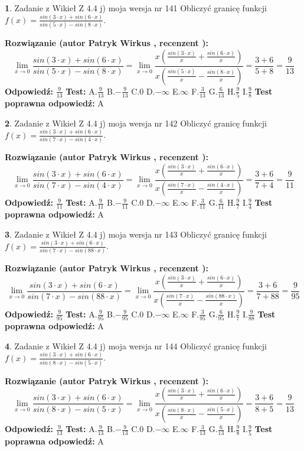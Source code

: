 \documentclass[12pt, a4paper]{article}
\theoremstyle{definition} %
\newtheorem{zad}{}
\newcommand{\zadStart}[1]{\begin{zad}#1\newline}
\newcommand{\zadStop}{\end{zad}}
\newcommand{\rozwStart}[2]{\noindent \textbf{Rozwiązanie (autor #1 , recenzent #2): }\newline}
\newcommand{\rozwStop}{\newline}
\newcommand{\odpStart}{\noindent \textbf{Odpowiedź:}\newline}
\newcommand{\odpStop}{\newline}
\newcommand{\testStart}{\noindent \textbf{Test:}\newline}
\newcommand{\testStop}{\newline}
\newcommand{\kluczStart}{\noindent \textbf{Test poprawna odpowiedź:}\newline}
\newcommand{\kluczStop}{\newline}
\begin{document}
\zadStart{Zadanie z Wikieł Z 4.4 j) moja wersja nr 141}
Obliczyć granicę funkcji $f(x)=\frac{sin(3\cdot x) +sin(6\cdot x)}{sin(5\cdot x) -sin(8\cdot x)}$.
\zadStop
\rozwStart{Patryk Wirkus}{}
$$\lim\limits_{x\to 0}\frac{sin(3\cdot x) +sin(6\cdot x)}{sin(5\cdot x) -sin(8\cdot x)}=\lim\limits_{x\to 0}\frac{x(\frac{sin(3\cdot x)}{x}+\frac{sin(6\cdot x)}{x})}{x(\frac{sin(5\cdot x)}{x}-\frac{sin(8\cdot x)}{x})}=\frac{3+6}{5+8} = \frac{9}{13}$$
\rozwStop
\odpStart
$\frac{9}{13}$
\odpStop
\testStart
A.$\frac{9}{13}$
B.$-\frac{9}{13}$
C.$0$
D.$-\infty$
E.$\infty$
F.$\frac{3}{13}$
G.$\frac{6}{13}$
H.$\frac{9}{5}$
I.$\frac{9}{8}$
\testStop
\kluczStart
A
\kluczStop



\zadStart{Zadanie z Wikieł Z 4.4 j) moja wersja nr 142}
Obliczyć granicę funkcji $f(x)=\frac{sin(3\cdot x) +sin(6\cdot x)}{sin(7\cdot x) -sin(4\cdot x)}$.
\zadStop
\rozwStart{Patryk Wirkus}{}
$$\lim\limits_{x\to 0}\frac{sin(3\cdot x) +sin(6\cdot x)}{sin(7\cdot x) -sin(4\cdot x)}=\lim\limits_{x\to 0}\frac{x(\frac{sin(3\cdot x)}{x}+\frac{sin(6\cdot x)}{x})}{x(\frac{sin(7\cdot x)}{x}-\frac{sin(4\cdot x)}{x})}=\frac{3+6}{7+4} = \frac{9}{11}$$
\rozwStop
\odpStart
$\frac{9}{11}$
\odpStop
\testStart
A.$\frac{9}{11}$
B.$-\frac{9}{11}$
C.$0$
D.$-\infty$
E.$\infty$
F.$\frac{3}{11}$
G.$\frac{6}{11}$
H.$\frac{9}{7}$
I.$\frac{9}{4}$
\testStop
\kluczStart
A
\kluczStop



\zadStart{Zadanie z Wikieł Z 4.4 j) moja wersja nr 143}
Obliczyć granicę funkcji $f(x)=\frac{sin(3\cdot x) +sin(6\cdot x)}{sin(7\cdot x) -sin(88\cdot x)}$.
\zadStop
\rozwStart{Patryk Wirkus}{}
$$\lim\limits_{x\to 0}\frac{sin(3\cdot x) +sin(6\cdot x)}{sin(7\cdot x) -sin(88\cdot x)}=\lim\limits_{x\to 0}\frac{x(\frac{sin(3\cdot x)}{x}+\frac{sin(6\cdot x)}{x})}{x(\frac{sin(7\cdot x)}{x}-\frac{sin(88\cdot x)}{x})}=\frac{3+6}{7+88} = \frac{9}{95}$$
\rozwStop
\odpStart
$\frac{9}{95}$
\odpStop
\testStart
A.$\frac{9}{95}$
B.$-\frac{9}{95}$
C.$0$
D.$-\infty$
E.$\infty$
F.$\frac{3}{95}$
G.$\frac{6}{95}$
H.$\frac{9}{7}$
I.$\frac{9}{88}$
\testStop
\kluczStart
A
\kluczStop



\zadStart{Zadanie z Wikieł Z 4.4 j) moja wersja nr 144}
Obliczyć granicę funkcji $f(x)=\frac{sin(3\cdot x) +sin(6\cdot x)}{sin(8\cdot x) -sin(5\cdot x)}$.
\zadStop
\rozwStart{Patryk Wirkus}{}
$$\lim\limits_{x\to 0}\frac{sin(3\cdot x) +sin(6\cdot x)}{sin(8\cdot x) -sin(5\cdot x)}=\lim\limits_{x\to 0}\frac{x(\frac{sin(3\cdot x)}{x}+\frac{sin(6\cdot x)}{x})}{x(\frac{sin(8\cdot x)}{x}-\frac{sin(5\cdot x)}{x})}=\frac{3+6}{8+5} = \frac{9}{13}$$
\rozwStop
\odpStart
$\frac{9}{13}$
\odpStop
\testStart
A.$\frac{9}{13}$
B.$-\frac{9}{13}$
C.$0$
D.$-\infty$
E.$\infty$
F.$\frac{3}{13}$
G.$\frac{6}{13}$
H.$\frac{9}{8}$
I.$\frac{9}{5}$
\testStop
\kluczStart
A
\kluczStop
\end{document}
